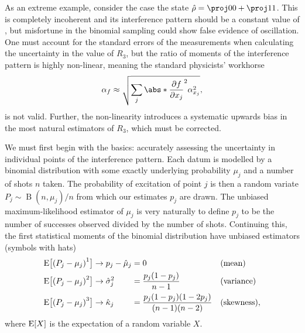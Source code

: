 As an extreme example, consider the case the state $\op\rho = \proj00 + \proj11$.
This is completely incoherent and its interference pattern should be a constant value of , but misfortune in the binomial sampling could show false evidence of oscillation.
One must account for the standard errors of the measurements when calculating the uncertainty in the value of $R_3$, but the ratio of moments of the interference pattern is highly non-linear, meaning the standard physicists' workhorse
\begin{equation}\label{eq:coherence-error-propagation}
\alpha_f \approx \sqrt{\sum_j\abs*{\frac{\partial f}{\partial x_j}}^2\alpha_{x_j}^2},
\end{equation}
is not valid.
Further, the non-linearity introduces a systematic upwards bias in the most natural estimators of $R_3$, which must be corrected.

We must first begin with the basics: accurately assessing the uncertainty in individual points of the interference pattern.
Each datum is modelled by a binomial distribution with some exactly underlying probability $\mu_j$ and a number of shots $n$ taken.
The probability of excitation of point $j$ is then a random variate $P_j\sim\operatorname B(n,\mu_j)/n$ from which our estimates $p_j$ are drawn.
The unbiased maximum-likelihood estimator of $\mu_j$ is very naturally to define $p_j$ to be the number of successes observed divided by the number of shots.
Continuing this, the first statistical moments of the binomial distribution have unbiased estimators (symbols with hats)~\cite{Chan2020}
\begin{equation}\label{eq:coherence-statistical-moments}\begin{alignedat}3
\expect[\big]{{(P_j - \mu_j)}^1} &\to p_j - \hat\mu_j &&= 0 &\quad&\text{(mean)}\\
\expect[\big]{{(P_j - \mu_j)}^2} &\to \hat \sigma_j^2 &&= \frac{p_j (1 - p_j)}{n-1} &&\text{(variance)}\\
\expect[\big]{{(P_j - \mu_j)}^3} &\to \hat \kappa_j &&= \frac{p_j (1 - p_j) (1 - 2p_j)}{(n-1)(n-2)} &&\text{(skewness)},
\end{alignedat}\end{equation}
where $\operatorname E[X]$ is the expectation of a random variable $X$.

